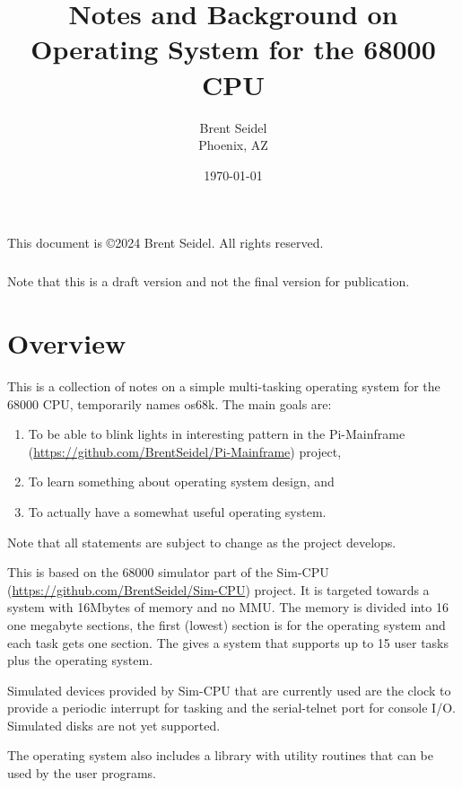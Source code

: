 \documentclass[10pt, openany]{book}
\title{Notes and Background on Operating System for the 68000 CPU}
\author{Brent Seidel \\ Phoenix, AZ}
\date{ \today }
\begin{document}
\maketitle
\begin{center}
This document is \copyright 2024 Brent Seidel.  All rights reserved.

\paragraph{}Note that this is a draft version and not the final version for publication.
\end{center}
\tableofcontents

\chapter{Overview}

This is a collection of notes on a simple multi-tasking operating system for the 68000 CPU, temporarily names os68k.  The main goals are:
\begin{enumerate}
  \item To be able to blink lights in interesting pattern in the Pi-Mainframe (\url{https://github.com/BrentSeidel/Pi-Mainframe}) project,
  \item To learn something about operating system design, and
  \item To actually have a somewhat useful operating system.
\end{enumerate}

Note that all statements are subject to change as the project develops.

This is based on the 68000 simulator part of the Sim-CPU (\url{https://github.com/BrentSeidel/Sim-CPU}) project.  It is targeted towards a system with 16Mbytes of memory and no MMU.  The memory is divided into 16 one megabyte sections, the first (lowest) section is for the operating system and each task gets one section.  The gives a system that supports up to 15 user tasks plus the operating system.

Simulated devices provided by Sim-CPU that are currently used are the clock to provide a periodic interrupt for tasking and the serial-telnet port for console I/O.  Simulated disks are not yet supported.

The operating system also includes a library with utility routines that can be used by the user programs.

\end{document}
